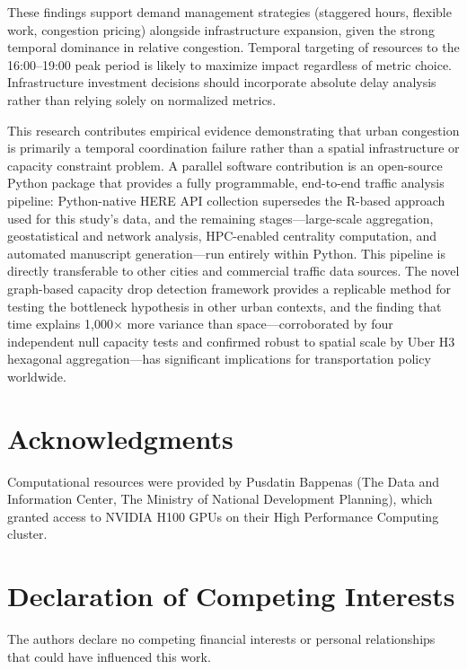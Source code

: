 \documentclass[12pt,a4paper]{article}
\begin{document}
These findings support demand management strategies (staggered hours, flexible work, congestion pricing) alongside infrastructure expansion, given the strong temporal dominance in relative congestion. Temporal targeting of resources to the 16:00--19:00 peak period is likely to maximize impact regardless of metric choice. Infrastructure investment decisions should incorporate absolute delay analysis rather than relying solely on normalized metrics.

This research contributes empirical evidence demonstrating that urban congestion is primarily a temporal coordination failure rather than a spatial infrastructure or capacity constraint problem. A parallel software contribution is an open-source Python package that provides a fully programmable, end-to-end traffic analysis pipeline: Python-native HERE API collection supersedes the R-based approach used for this study's data, and the remaining stages---large-scale aggregation, geostatistical and network analysis, HPC-enabled centrality computation, and automated manuscript generation---run entirely within Python. This pipeline is directly transferable to other cities and commercial traffic data sources. The novel graph-based capacity drop detection framework provides a replicable method for testing the bottleneck hypothesis in other urban contexts, and the finding that time explains 1,000$\times$ more variance than space---corroborated by four independent null capacity tests and confirmed robust to spatial scale by Uber H3 hexagonal aggregation---has significant implications for transportation policy worldwide.



\section*{Acknowledgments}

Computational resources were provided by Pusdatin Bappenas (The Data and Information Center, The Ministry of National Development Planning), which granted access to NVIDIA H100 GPUs on their High Performance Computing cluster.



\section*{Declaration of Competing Interests}

The authors declare no competing financial interests or personal relationships that could have influenced this work.
\end{document}
